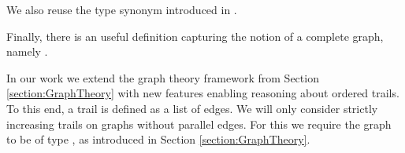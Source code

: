 \begin{isabellebody}
\begin{isamarkuptext}
\noindent We also reuse the type synonym  introduced in \mbox{}. \vspace{1em}

  \vspace{1em}

Finally, there is an useful definition capturing the notion of a complete graph, namely .%
\end{isamarkuptext}\isamarkuptrue%
%
\isadelimdocument
%
\endisadelimdocument
%
\isatagdocument
%
\isamarkuptrue%
%
\endisatagdocument
{\isafolddocument}%
%
\isadelimdocument
%
\endisadelimdocument
%
\begin{isamarkuptext}%
\label{section:trails} In our work we extend the graph theory framework from Section \ref{section:GraphTheory} 
with new features enabling reasoning about ordered trails. To this end,
 a trail is defined as a list of edges. We will only consider strictly increasing trails 
on graphs without parallel edges. For this we require the graph 
to be of type , as introduced in Section \ref{section:GraphTheory}. 


\end{isamarkuptext}
\end{isabellebody}
